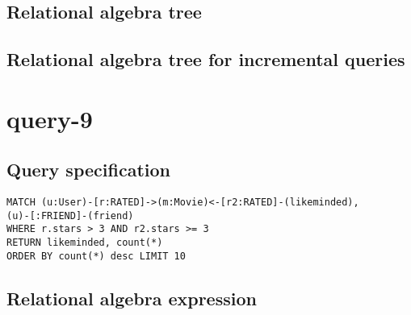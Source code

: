 \subsection*{Relational algebra tree}

\subsection*{Relational algebra tree for incremental queries}

\section{query-9}

\subsection*{Query specification}

\begin{lstlisting}
MATCH (u:User)-[r:RATED]->(m:Movie)<-[r2:RATED]-(likeminded),
(u)-[:FRIEND]-(friend)
WHERE r.stars > 3 AND r2.stars >= 3
RETURN likeminded, count(*)
ORDER BY count(*) desc LIMIT 10
\end{lstlisting}

\subsection*{Relational algebra expression}

